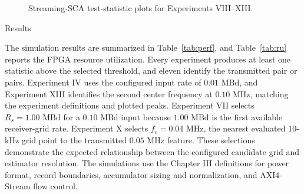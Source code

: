 \begin{figure}[H]
\centering

\begin{subfigure}{.5\textwidth}
    \centering
\end{subfigure}%
\begin{subfigure}{.5\textwidth}
    \centering
\end{subfigure}

\begin{subfigure}{.5\textwidth}
    \centering
\end{subfigure}%
\begin{subfigure}{.5\textwidth}
    \centering
\end{subfigure}

\begin{subfigure}{.5\textwidth}
    \centering
\end{subfigure}%
\begin{subfigure}{.5\textwidth}
    \centering
\end{subfigure}

\caption{Streaming-SCA test-statistic plots for Experiments VIII--XIII.}
\end{figure}

\clearpage

%
%
\bigskip
{}
  \quad Results

The simulation results are summarized in Table~\ref{tab:perf}, and Table~\ref{tab:ru} reports the FPGA resource utilization.  Every experiment produces at least one statistic above the selected threshold, and eleven identify the transmitted pair or pairs.  Experiment IV uses the configured input rate of $0.01\text{ MBd}$, and Experiment XIII identifies the second center frequency at $0.10\text{ MHz}$, matching the experiment definitions and plotted peaks.  Experiment VII selects $R_s=1.00\text{ MBd}$ for a $0.10\text{ MBd}$ input because $1.00\text{ MBd}$ is the first available receiver-grid rate.  Experiment X selects $f_c=0.04\text{ MHz}$, the nearest evaluated 10-kHz grid point to the transmitted $0.05\text{ MHz}$ feature.  These selections demonstrate the expected relationship between the configured candidate grid and estimator resolution.  The simulations use the Chapter III definitions for power format, record boundaries, accumulator sizing and normalization, and AXI4-Stream flow control.

